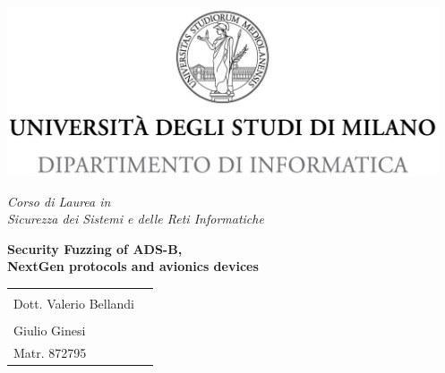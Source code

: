 \begin{titlepage}
  \begin{center}
    \includegraphics[height=5.0cm]{images/minerva_2013_DI.jpg}

    \vspace*{.4cm}
    {\Large
      \emph{Corso di Laurea in\\[.3cm]
         Sicurezza dei Sistemi e delle Reti Informatiche}
    }
    \vfill
    \begin{LARGE}
      \textbf{Security Fuzzing of ADS-B,\\[.4cm]NextGen protocols and avionics devices}
    \end{LARGE}

    \vfill
    \begin{minipage}{.99\linewidth}
      \begin{tabular}{l r}
        \begin{minipage}{.5\linewidth}
          \begin{flushleft}
            {\large
              RELATORE\\[.2cm]
              Dott. Valerio Bellandi\\[.6cm]

            }

          \end{flushleft}
        \end{minipage}
        &
        \begin{minipage}{.45\linewidth}
          \begin{flushright}
            {\large
              TESI DI LAUREA DI\\[.3cm]
              Giulio Ginesi\\[.45cm]
              Matr. 872795
            }
          \end{flushright}
        \end{minipage}
      \end{tabular}
    \end{minipage}


\end{center}
\end{titlepage}
